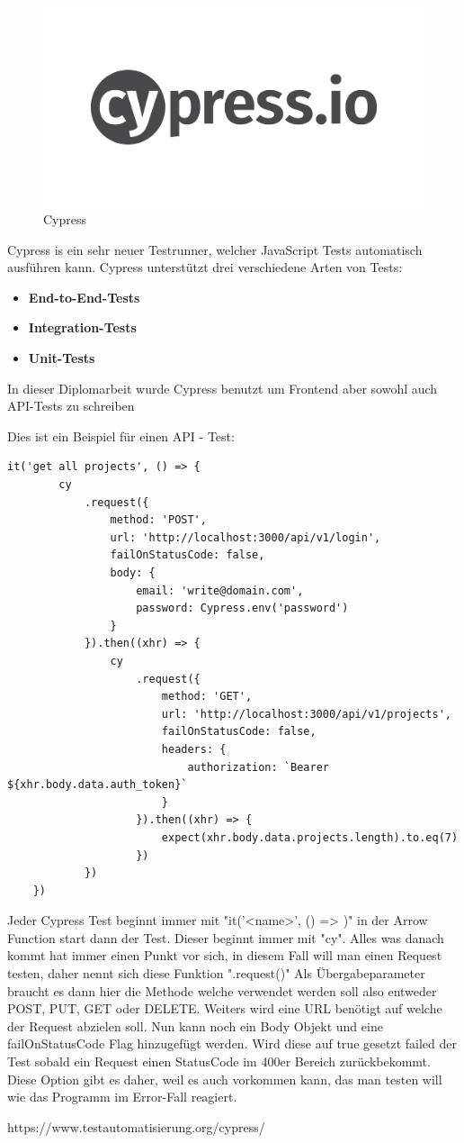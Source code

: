 \begin{figure}
    \centering
    \includegraphics[width=0.5\linewidth]{pics/cypress-logo.png}
    \caption{Cypress}
    \label{fig:enter-label}
\end{figure}


Cypress is ein sehr neuer Testrunner, welcher JavaScript Tests automatisch ausführen kann.
Cypress unterstützt drei verschiedene Arten von Tests:

\begin{itemize}
\item \textbf{End-to-End-Tests}
\item \textbf{Integration-Tests}
\item \textbf{Unit-Tests}
\end{itemize}

In dieser Diplomarbeit wurde Cypress benutzt um Frontend aber sowohl auch API-Tests zu schreiben

Dies ist ein Beispiel für einen API - Test:

\begin{lstlisting}
it('get all projects', () => {
        cy
            .request({
                method: 'POST',
                url: 'http://localhost:3000/api/v1/login',
                failOnStatusCode: false,
                body: {
                    email: 'write@domain.com',
                    password: Cypress.env('password')
                }
            }).then((xhr) => {
                cy
                    .request({
                        method: 'GET',
                        url: 'http://localhost:3000/api/v1/projects',
                        failOnStatusCode: false,
                        headers: {
                            authorization: `Bearer ${xhr.body.data.auth_token}`
                        }
                    }).then((xhr) => {
                        expect(xhr.body.data.projects.length).to.eq(7)
                    })
            })
    })
\end{lstlisting}

Jeder Cypress Test beginnt immer mit "it('<name>', () => {})" in der Arrow Function start dann der Test. Dieser beginnt immer mit "cy". Alles was danach kommt hat immer einen Punkt vor sich, in diesem Fall will man einen Request testen, daher nennt sich diese Funktion ".request({})" Als Übergabeparameter braucht es dann hier die Methode welche verwendet werden soll also entweder POST, PUT, GET oder DELETE. Weiters wird eine URL benötigt auf welche der Request abzielen soll. Nun kann noch ein Body Objekt und eine failOnStatusCode Flag hinzugefügt werden. Wird diese auf true gesetzt failed der Test sobald ein Request einen StatusCode im 400er Bereich zurückbekommt. Diese Option gibt es daher, weil es auch vorkommen kann, das man testen will wie das Programm im Error-Fall reagiert.


\cite{Cypress}
https://www.testautomatisierung.org/cypress/